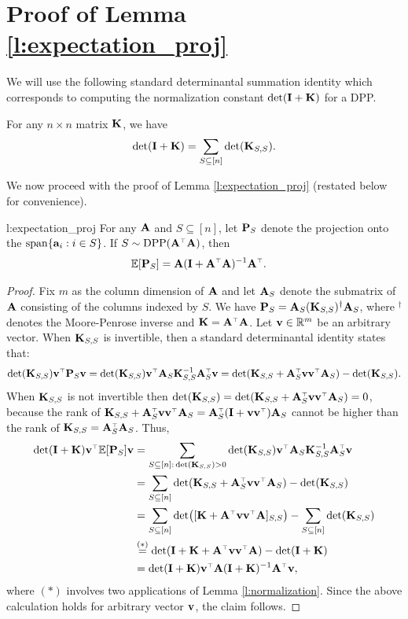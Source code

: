 \documentclass{article}
\begin{document}
\section{Proof of Lemma \ref{l:expectation_proj}}
\label{a:expectration-proj}
  We will use the following standard determinantal summation identity
  \citep[see Theorem 2.1 in][]{dpp-ml} which corresponds to computing the
normalization constant $\det(\I+\K)$ for a DPP.
  \begin{lemma}\label{l:normalization}
    For any $n\times n$ matrix $\K$, we have
    \begin{align*}
      \det(\I+\K) = \sum_{S\subseteq[n]}\det(\K_{S,S}).
      \end{align*}
    \end{lemma}
We now proceed with the proof of Lemma \ref{l:expectation_proj}
(restated below for convenience).
  \begin{replemma}{l:expectation_proj}
  For any $\A$ and $S\subseteq [n]$, let $\P_S$ denote the  
projection onto the $\mathrm{span}\{\a_i:i\in S\}$. If $S\sim \DPP(\A^\top\A)$, then
\begin{align*}
  \E[\P_S] & = \A(\I+\A^\top\A)^{-1}\A^\top.
\end{align*}
\end{replemma}
\begin{proof}
Fix $m$ as the column dimension of $\A$ and let $\A_S$ denote the
submatrix of $\A$ consisting of the columns 
indexed by $S$. We have $\P_S=\A_S(\K_{S,S})^\dagger\A_S$, where $^\dagger$
denotes the Moore-Penrose inverse and $\K=\A^\top\A$. Let
$\v\in\R^m$ be an arbitrary vector. When $\K_{S,S}$ is
invertible, then a standard determinantal 
identity states that:
  \begin{align*}
\det(\K_{S,S})\v^\top\P_S\v
    =\det(\K_{S,S})\v^\top\A_S\K_{S,S}^{-1}\A_S^\top\v =
    \det(\K_{S,S}+\A_S^\top\v\v^\top\A_S)-\det(\K_{S,S}). 
  \end{align*}
When $\K_{S,S}$ is not invertible then
$\det(\K_{S,S})=\det(\K_{S,S}+\A_S^\top\v\v^\top\A_S)=0$, because the
rank of $\K_{S,S}+\A_S^\top\v\v^\top\A_S=\A_S^\top(\I+\v\v^\top)\A_S$
cannot be higher than the rank of $\K_{S,S}=\A_S^\top\A_S$. Thus,
\begin{align*}
  \det(\I+\K)\v^\top\E[\P_S]\v
  &= \sum_{S\subseteq[n]:\,\det(\K_{S,S})>0}\det(\K_{S,S})
\v^\top\A_S\K_{S,S}^{-1}\A_S^\top\v\\
  &=\sum_{S\subseteq[n]}\det(\K_{S,S}+\A_S^\top\v\v^\top\A_S)-\det(\K_{S,S})\\
  &=\sum_{S\subseteq[n]}\det\!\big([\K+\A^\top\v\v^\top\A]_{S,S}\big)-\sum_{S\subseteq[n]}\det(\K_{S,S})\\
  &\overset{(*)}{=}\det(\I + \K + \A^\top\v\v^\top\A) - \det(\I+\K)\\
  &=\det(\I+\K)\v^\top\A(\I+\K)^{-1}\A^\top\v,
\end{align*}
where $(*)$ involves two applications of Lemma \ref{l:normalization}. Since the above
calculation holds for arbitrary vector $\v$, the claim follows.
\end{proof}
\end{document}
